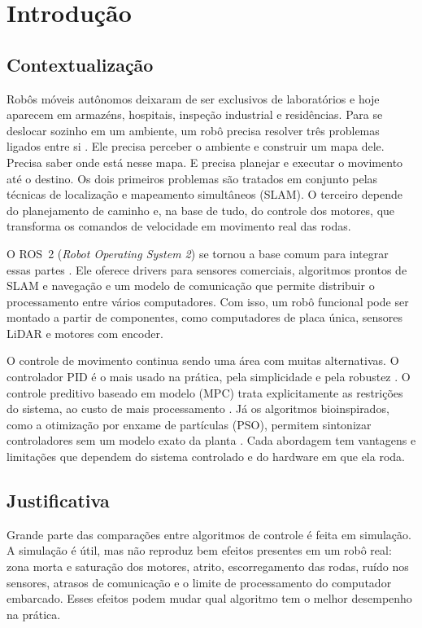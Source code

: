 \chapter[Introdução]{Introdução}
\label{cap:introducao}

\section{Contextualização}

Robôs móveis autônomos deixaram de ser exclusivos de laboratórios e hoje
aparecem em armazéns, hospitais, inspeção industrial e residências. Para
se deslocar sozinho em um ambiente, um robô precisa resolver três
problemas ligados entre si \cite{siegwart2011}. Ele precisa perceber o
ambiente e construir um mapa dele. Precisa saber onde está nesse mapa. E
precisa planejar e executar o movimento até o destino. Os dois primeiros
problemas são tratados em conjunto pelas técnicas de localização e
mapeamento simultâneos (SLAM). O terceiro depende do planejamento de
caminho e, na base de tudo, do controle dos motores, que transforma os
comandos de velocidade em movimento real das rodas.

O ROS~2 (\textit{Robot Operating System 2}) se tornou a base comum para
integrar essas partes \cite{macenski2022ros2}. Ele oferece drivers para
sensores comerciais, algoritmos prontos de SLAM e navegação e um modelo
de comunicação que permite distribuir o processamento entre vários
computadores. Com isso, um robô funcional pode ser montado a partir de
componentes, como computadores de placa única, sensores LiDAR e motores com encoder.

O controle de movimento continua sendo uma área com muitas alternativas.
O controlador PID é o mais usado na prática, pela simplicidade e pela
robustez \cite{astrom2006}. O controle preditivo baseado em modelo (MPC)
trata explicitamente as restrições do sistema, ao custo de mais
processamento \cite{camacho2007}. Já os algoritmos bioinspirados, como a
otimização por enxame de partículas (PSO), permitem sintonizar
controladores sem um modelo exato da planta \cite{kennedy1995pso}. Cada
abordagem tem vantagens e limitações que dependem do sistema controlado e
do hardware em que ela roda.

\section{Justificativa}

Grande parte das comparações entre algoritmos de controle é feita em
simulação. A simulação é útil, mas não reproduz bem efeitos presentes em
um robô real: zona morta e saturação dos motores, atrito, escorregamento
das rodas, ruído nos sensores, atrasos de comunicação e o limite de
processamento do computador embarcado. Esses efeitos podem mudar qual
algoritmo tem o melhor desempenho na prática.

